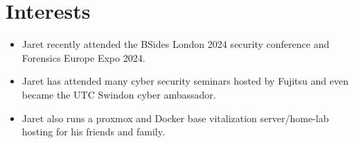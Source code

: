 \section*{Interests}
\begin{itemize}
    \item Jaret recently attended the BSides London 2024  security conference and Forensics Europe Expo 2024.
    \item Jaret has attended many cyber security seminars hosted by Fujitsu and even became the UTC Swindon cyber ambassador.
    \item Jaret also runs a proxmox and Docker base vitalization server/home-lab hosting for his friends and family.
\end{itemize}